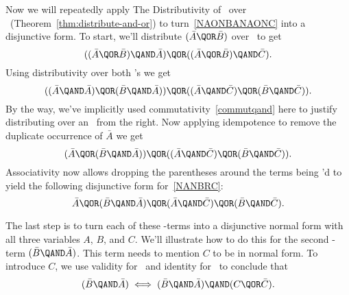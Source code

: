 Now we will repeatedly apply The Distributivity of \QAND\ over \QOR\
(Theorem~\ref{thm:distribute-and-or}) to turn~\eqref{NAONBANAONC} into a
disjunctive form.  To start, we'll distribute $(\bar{A} \QOR \bar{B})$
over \QAND\ to get
\[
((\bar{A} \QOR \bar{B}) \QAND \bar{A}) \QOR ((\bar{A} \QOR \bar{B}) \QAND \bar{C}).
\]
Using distributivity over both \QAND's we get
\[
((\bar{A} \QAND \bar{A}) \QOR (\bar{B} \QAND \bar{A})) \QOR 
((\bar{A} \QAND \bar{C}) \QOR (\bar{B} \QAND \bar{C})).
\]
By the way, we've implicitly used commutativity~\eqref{commutqand}
here to justify distributing over an \QAND\ from the right.  Now
applying idempotence to remove the duplicate occurrence of $\bar{A}$ we
get
\[
(\bar{A} \QOR (\bar{B} \QAND \bar{A})) \QOR 
((\bar{A} \QAND \bar{C}) \QOR (\bar{B} \QAND \bar{C})).
\]
Associativity now allows dropping the parentheses around the terms
being \QOR'd to yield the following disjunctive form for~\eqref{NANBRC}:
\begin{equation}\label{DFNAONBANAONC}
\bar{A} \QOR
(\bar{B} \QAND \bar{A}) \QOR 
(\bar{A} \QAND \bar{C}) \QOR
(\bar{B} \QAND \bar{C}).
\end{equation}

The last step is to turn each of these \QAND-terms into a disjunctive
normal form with all three variables $A$, $B$, and $C$.  We'll
illustrate how to do this for the second \QAND-term
$(\bar{B} \QAND \bar{A})$.  This term needs to mention $C$ to be in
normal form.  To introduce $C$, we use validity for \QOR\ and
identity for \QAND\ to conclude that
\[
(\bar{B} \QAND \bar{A}) \iff (\bar{B} \QAND \bar{A}) \QAND (C \QOR \bar{C}).
\]

\iffalse
$\bar{B} \QAND \bar{A}$
is equivalent to
\[
(\bar{B} \QAND \bar{A}) \QAND (C \QOR \bar{C}).
\]
\fi

